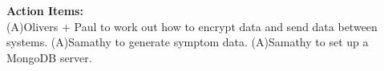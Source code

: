 \documentclass[a4wide,10pt]{extarticle}
\begin{document}
{{\large \textbf{Action Items:\\}}
(A)Olivers + Paul to work out how to encrypt data and send data between systems.
(A)Samathy to generate symptom data.
(A)Samathy to set up a MongoDB server.
\hfill \break
\hfill \break
\hfill \break
\hfill \break
\hfill \break



\subsection*{\color{red}{Next Meeting: Thursday March 3rd}}

}
\end{document}
